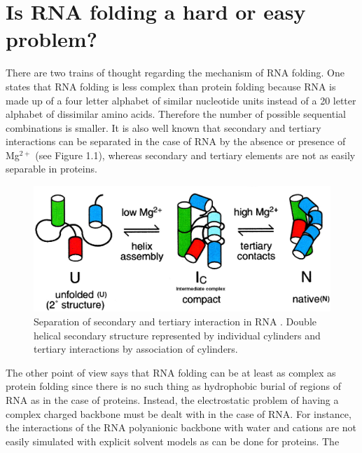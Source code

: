 \section{Is RNA folding a hard or easy problem?}
There  are  two trains  of  thought  regarding  the mechanism  of  RNA
folding.  One states  that RNA  folding is  less complex  than protein
folding  \cite{tinoco1999} because  RNA is  made up  of a  four letter
alphabet of similar  nucleotide units instead of a  20 letter alphabet
of  dissimilar   amino  acids.   Therefore  the   number  of  possible
sequential  combinations  is smaller.   It  is  also  well known  that
secondary and  tertiary interactions can  be separated in the  case of
RNA  by the absence  or presence  of Mg$^{2+}$  \cite{rangan2003} (see
Figure 1.1), whereas secondary and tertiary elements are not as easily
separable in proteins.
\begin{figure}[ht]
\centering
\includegraphics[scale=0.3]{Chapter1/rangan2003pnas.png}
\caption{Separation of secondary and tertiary interaction in
RNA \cite{rangan2003}. Double helical secondary structure
represented  by individual cylinders and tertiary interactions by
association of cylinders.}
\end{figure}
The  other point of  view says  that RNA  folding can  be at  least as
complex as protein folding \cite{moore1999a, sorin2004} since there is
no such thing  as hydrophobic burial of regions of RNA  as in the case
of proteins.  Instead, the electrostatic  problem of having  a complex
charged backbone must be dealt with in the case of RNA.
For instance,  the interactions of  the RNA polyanionic  backbone with
water  and cations  \cite{klein2004a}  are not  easily simulated  with
explicit   solvent  models   as  can   be  done   for   proteins.  The

